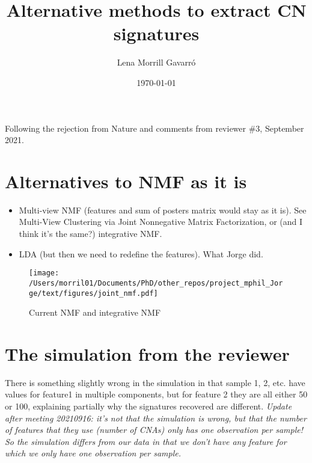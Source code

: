 \documentclass[11pt,a4paper,roman]{article}
\begin{document}
\author{Lena Morrill Gavarr\'o}
\title{Alternative methods to extract CN signatures}
\date{\today}

\maketitle

Following the rejection from Nature and comments from reviewer \#3, September 2021.

\tableofcontents

\clearpage

\section{Alternatives to NMF as it is}
\begin{itemize}
\item Multi-view NMF (features and sum of posters matrix would stay as it is). See Multi-View Clustering via Joint Nonnegative Matrix Factorization, or (and I think it's the same?) integrative NMF.
\item LDA (but then we need to redefine the features). What Jorge did.
\end{itemize}

\begin{figure}[h]
\texttt{[image: /Users/morril01/Documents/PhD/other\_repos/project\_mphil\_Jorge/text/figures/joint\_nmf.pdf]}
\caption{Current NMF and integrative NMF}
\end{figure}

\section{The simulation from the reviewer}

There is something slightly wrong in the simulation in that sample 1, 2, etc. have values for feature1 in multiple components, but for feature 2 they are all either 50 or 100, explaining partially why the signatures recovered are different. \emph{Update after meeting 20210916: it's not that the simulation is wrong, but that the number of features that they use (number of CNAs) only has one observation per sample! So the simulation differs from our data in that we don't have any feature for which we only have one observation per sample.}

\paragraph{}
\end{document}
